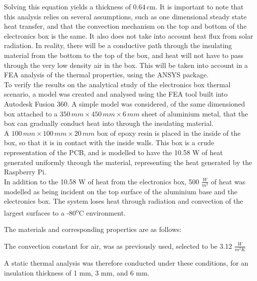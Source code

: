 Solving this equation yields a thickness of 0.64\,cm. It is important to note that this analysis relies on several assumptions, such as one dimensional steady state heat transfer, and that the convection mechanism on the top and bottom of the electronics box is the same. It also does not take into account heat flux from solar radiation. In reality, there will be a conductive path through the insulating material from the bottom to the top of the box, and heat will not have to pass through the very low density air in the box. This will be taken into account in a FEA analysis of the thermal properties, using the ANSYS package. \\

To verify the results on the analytical study of the electronics box thermal scenario, a model was created and analysed using the FEA tool built into Autodesk Fusion 360. A simple model was considered, of the same dimensioned box attached to a $350 \,mm \times 450\,mm \times 6\,mm$ sheet of aluminium metal, that the box can gradually conduct heat into through the insulating material. \\

A $100\,mm \times 100\,mm \times 20\,mm$ box of epoxy resin is placed in the inside of the box, so that it is in contact with the inside walls. This box is a crude representation of the PCB, and is modelled to have the 10.58 W of heat generated uniformly through the material, representing the heat generated by the Raspberry Pi. \\

In addition to the 10.58 W of heat from the electronics box, 500 $\frac{W}{m^{2}}$ of heat was modelled as being incident on the top surface of the aluminium base and the electronics box. The system loses heat through radiation and convection of the largest surfaces to a -80\textsuperscript{o}C environment. 

The materials and corresponding properties are as follows:



The convection constant for air, was as previously used, selected to be 3.12 $\frac{W}{m^2 K} $

A static thermal analysis was therefore conducted under these conditions, for an insulation thickness of 1 mm, 3 mm, and 6 mm. 

